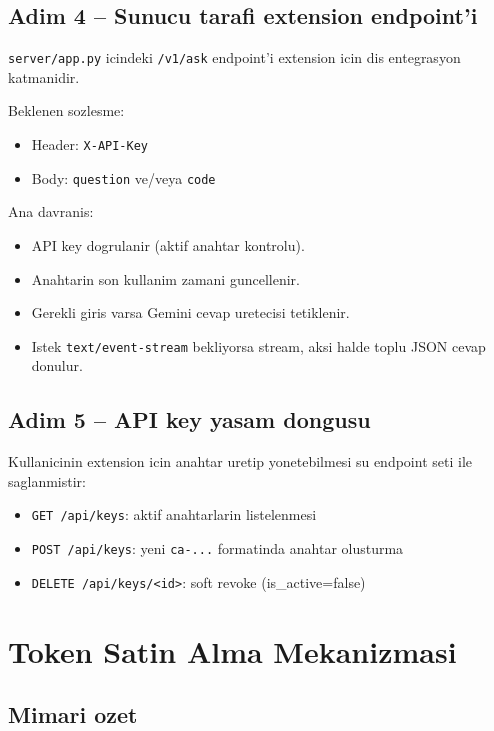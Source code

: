 \documentclass[11pt,a4paper]{article}
\begin{document}
\subsection{Adim 4 -- Sunucu tarafi extension endpoint'i}

\texttt{server/app.py} icindeki \texttt{/v1/ask} endpoint'i extension icin dis entegrasyon katmanidir.

Beklenen sozlesme:
\begin{itemize}[leftmargin=1.5em]
	\item Header: \texttt{X-API-Key}
	\item Body: \texttt{question} ve/veya \texttt{code}
\end{itemize}

Ana davranis:
\begin{itemize}[leftmargin=1.5em]
	\item API key dogrulanir (aktif anahtar kontrolu).
	\item Anahtarin son kullanim zamani guncellenir.
	\item Gerekli giris varsa Gemini cevap uretecisi tetiklenir.
	\item Istek \texttt{text/event-stream} bekliyorsa stream, aksi halde toplu JSON cevap donulur.
\end{itemize}

\subsection{Adim 5 -- API key yasam dongusu}

Kullanicinin extension icin anahtar uretip yonetebilmesi su endpoint seti ile saglanmistir:
\begin{itemize}[leftmargin=1.5em]
	\item \texttt{GET /api/keys}: aktif anahtarlarin listelenmesi
	\item \texttt{POST /api/keys}: yeni \texttt{ca-...} formatinda anahtar olusturma
	\item \texttt{DELETE /api/keys/<id>}: soft revoke (is_active=false)
\end{itemize}

\section{Token Satin Alma Mekanizmasi}

\subsection{Mimari ozet}
\end{document}
